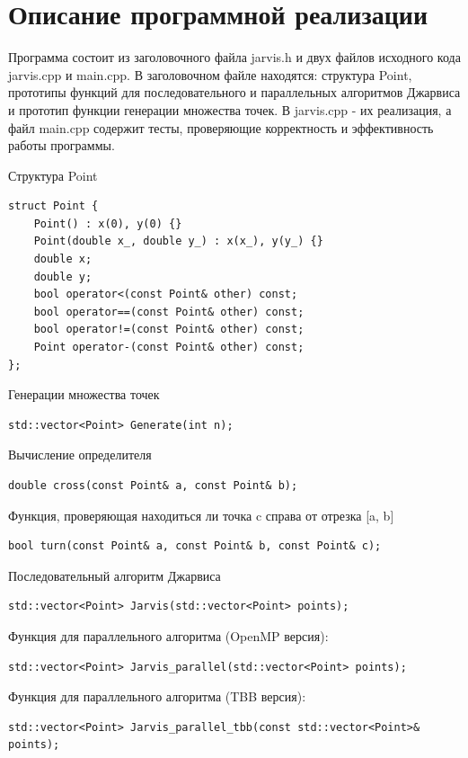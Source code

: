 \documentclass{report}
\begin{document}
\section*{Описание программной реализации}
Программа состоит из заголовочного файла jarvis.h и двух файлов исходного кода  jarvis.cpp и main.cpp. В заголовочном файле находятся: структура Point, прототипы функций для последовательного и параллельных алгоритмов Джарвиса и прототип функции генерации множества точек. В jarvis.cpp - их реализация, а файл main.cpp содержит тесты, проверяющие корректность и эффективность работы программы.
\par Структура Point \par
\begin{lstlisting}
struct Point {
	Point() : x(0), y(0) {}
	Point(double x_, double y_) : x(x_), y(y_) {}
	double x;
	double y;
	bool operator<(const Point& other) const;
	bool operator==(const Point& other) const;
	bool operator!=(const Point& other) const;
	Point operator-(const Point& other) const;
};
\end{lstlisting}
\par Генерации множества точек \par
\begin{lstlisting}
std::vector<Point> Generate(int n);
\end{lstlisting}
\par  Вычисление определителя \par
\begin{lstlisting}
double cross(const Point& a, const Point& b);
\end{lstlisting}
\par Функция, проверяющая находиться ли точка c справа от отрезка [a, b]\par
\begin{lstlisting}
bool turn(const Point& a, const Point& b, const Point& c);
\end{lstlisting}
\par Последовательный алгоритм Джарвиса
\begin{lstlisting}
std::vector<Point> Jarvis(std::vector<Point> points);
\end{lstlisting}
\par Функция для параллельного алгоритма (OpenMP версия):
\begin{lstlisting}
std::vector<Point> Jarvis_parallel(std::vector<Point> points);
\end{lstlisting}
\par Функция для параллельного алгоритма (TBB версия):
\begin{lstlisting}
std::vector<Point> Jarvis_parallel_tbb(const std::vector<Point>& points);
\end{lstlisting}
\end{document}
